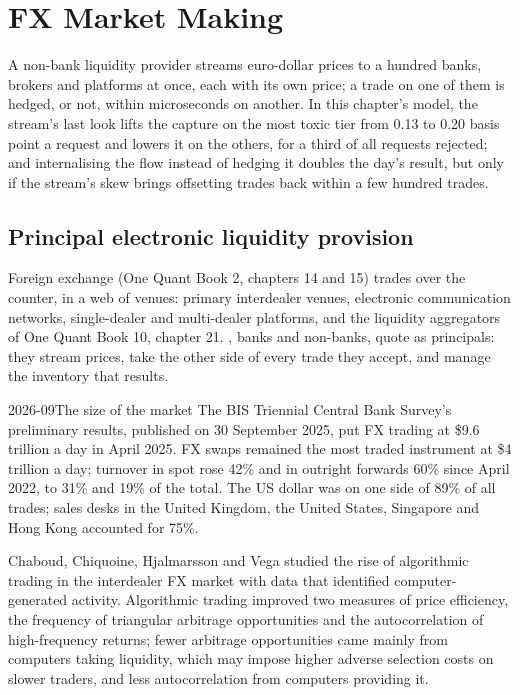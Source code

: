 \chapter{FX Market Making}\label{ch:hf:fx-market-making}

A non-bank liquidity provider streams euro-dollar prices to a hundred banks, brokers and platforms at once, each with its own price; a trade on one
of them is hedged, or not, within microseconds on another. In this chapter's model, the stream's last look lifts the capture on the most toxic
tier from 0.13 to 0.20 basis point a request and lowers it on the others, for a third of all requests rejected; and internalising the flow instead
of hedging it doubles the day's result, but only if the stream's skew brings offsetting trades back within a few hundred trades.

\section{Principal electronic liquidity provision}

Foreign exchange (One Quant Book 2, chapters 14 and 15) trades over the counter, in a web of venues: primary interdealer venues, electronic
communication networks, single-dealer and multi-dealer platforms, and the liquidity aggregators of One Quant Book 10, chapter 21. , banks and non-banks, quote as principals: they stream prices, take the other side of every trade they accept, and manage the inventory
that results.

\begin{dated}{2026-09}{The size of the market}\label{dat:hf:fx-market-making:bis}
The BIS Triennial Central Bank Survey's preliminary results, published on 30 September 2025, put FX trading at \$9.6 trillion a day in April 2025.
FX swaps remained the most traded instrument at \$4 trillion a day; turnover in spot rose 42\% and in outright forwards 60\% since April 2022, to 31\%
and 19\% of the total. The US dollar was on one side of 89\% of all trades; sales desks in the United Kingdom, the United States, Singapore and Hong
Kong accounted for 75\%.
\end{dated}

Chaboud, Chiquoine, Hjalmarsson and Vega studied the rise of algorithmic trading in the interdealer FX market with data that identified
computer-generated activity. Algorithmic trading improved two measures of price efficiency, the frequency of triangular arbitrage opportunities and
the autocorrelation of high-frequency returns; fewer arbitrage opportunities came mainly from computers taking liquidity, which may impose higher
adverse selection costs on slower traders, and less autocorrelation from computers providing it.

